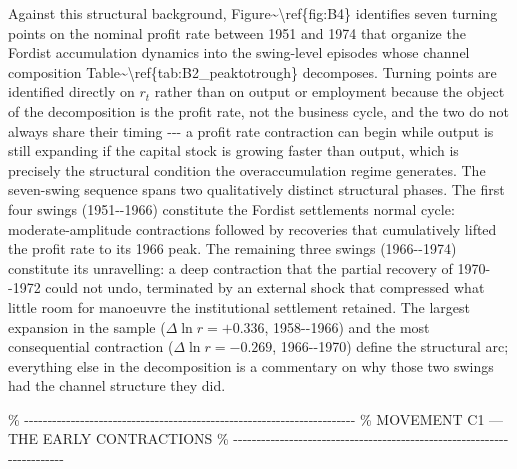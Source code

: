 Against this structural background,
Figure\textasciitilde\textbackslash ref\{fig:B4\} identifies seven
turning points on the nominal profit rate between 1951 and 1974 that
organize the Fordist accumulation dynamics into the swing-level episodes
whose channel composition
Table\textasciitilde\textbackslash ref\{tab:B2\_peaktotrough\}
decomposes. Turning points are identified directly on \(r_{t}\) rather
than on output or employment because the object of the decomposition is
the profit rate, not the business cycle, and the two do not always share
their timing -\/-\/- a profit rate contraction can begin while output is
still expanding if the capital stock is growing faster than output,
which is precisely the structural condition the overaccumulation regime
generates. The seven-swing sequence spans two qualitatively distinct
structural phases. The first four swings (1951-\/-1966) constitute the
Fordist settlement\textquotesingle s normal cycle: moderate-amplitude
contractions followed by recoveries that cumulatively lifted the profit
rate to its 1966 peak. The remaining three swings (1966-\/-1974)
constitute its unravelling: a deep contraction that the partial recovery
of 1970-\/-1972 could not undo, terminated by an external shock that
compressed what little room for manoeuvre the institutional settlement
retained. The largest expansion in the sample (\(\Delta\ln r = +0.336\),
1958-\/-1966) and the most consequential contraction
(\(\Delta\ln r = -0.269\), 1966-\/-1970) define the structural arc;
everything else in the decomposition is a commentary on why those two
swings had the channel structure they did.

\%
-\/-\/-\/-\/-\/-\/-\/-\/-\/-\/-\/-\/-\/-\/-\/-\/-\/-\/-\/-\/-\/-\/-\/-\/-\/-\/-\/-\/-\/-\/-\/-\/-\/-\/-\/-\/-\/-\/-\/-\/-\/-\/-\/-\/-\/-\/-\/-\/-\/-\/-\/-\/-\/-\/-\/-\/-\/-\/-\/-\/-\/-\/-\/-\/-\/-\/-\/-\/-\/-\/-
\% MOVEMENT C1 --- THE EARLY CONTRACTIONS \%
-\/-\/-\/-\/-\/-\/-\/-\/-\/-\/-\/-\/-\/-\/-\/-\/-\/-\/-\/-\/-\/-\/-\/-\/-\/-\/-\/-\/-\/-\/-\/-\/-\/-\/-\/-\/-\/-\/-\/-\/-\/-\/-\/-\/-\/-\/-\/-\/-\/-\/-\/-\/-\/-\/-\/-\/-\/-\/-\/-\/-\/-\/-\/-\/-\/-\/-\/-\/-\/-\/-


